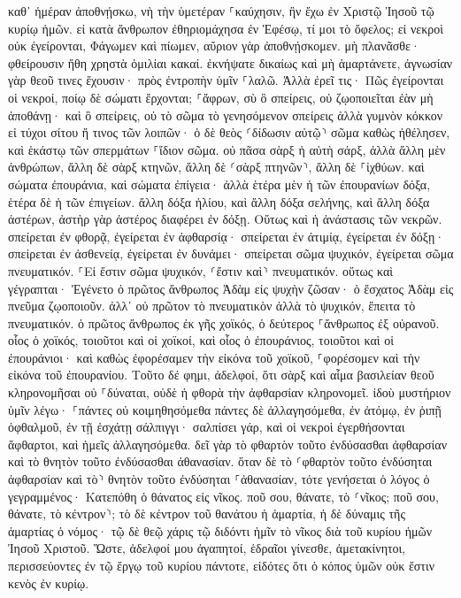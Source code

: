 \documentclass[twoside, 9pt]{extreport}
\begin{document}
καθ᾽ ἡμέραν ἀποθνῄσκω, νὴ τὴν ὑμετέραν ⸀καύχησιν, ἣν ἔχω ἐν Χριστῷ Ἰησοῦ τῷ κυρίῳ ἡμῶν. 
εἰ κατὰ ἄνθρωπον ἐθηριομάχησα ἐν Ἐφέσῳ, τί μοι τὸ ὄφελος; εἰ νεκροὶ οὐκ ἐγείρονται, Φάγωμεν καὶ πίωμεν, αὔριον γὰρ ἀποθνῄσκομεν. 
μὴ πλανᾶσθε· φθείρουσιν ἤθη χρηστὰ ὁμιλίαι κακαί. 
ἐκνήψατε δικαίως καὶ μὴ ἁμαρτάνετε, ἀγνωσίαν γὰρ θεοῦ τινες ἔχουσιν· πρὸς ἐντροπὴν ὑμῖν ⸀λαλῶ. 
Ἀλλὰ ἐρεῖ τις· Πῶς ἐγείρονται οἱ νεκροί, ποίῳ δὲ σώματι ἔρχονται; 
⸀ἄφρων, σὺ ὃ σπείρεις, οὐ ζῳοποιεῖται ἐὰν μὴ ἀποθάνῃ· 
καὶ ὃ σπείρεις, οὐ τὸ σῶμα τὸ γενησόμενον σπείρεις ἀλλὰ γυμνὸν κόκκον εἰ τύχοι σίτου ἤ τινος τῶν λοιπῶν· 
ὁ δὲ θεὸς ⸂δίδωσιν αὐτῷ⸃ σῶμα καθὼς ἠθέλησεν, καὶ ἑκάστῳ τῶν σπερμάτων ⸀ἴδιον σῶμα. 
οὐ πᾶσα σὰρξ ἡ αὐτὴ σάρξ, ἀλλὰ ἄλλη μὲν ἀνθρώπων, ἄλλη δὲ σὰρξ κτηνῶν, ἄλλη δὲ ⸂σὰρξ πτηνῶν⸃, ἄλλη δὲ ⸀ἰχθύων. 
καὶ σώματα ἐπουράνια, καὶ σώματα ἐπίγεια· ἀλλὰ ἑτέρα μὲν ἡ τῶν ἐπουρανίων δόξα, ἑτέρα δὲ ἡ τῶν ἐπιγείων. 
ἄλλη δόξα ἡλίου, καὶ ἄλλη δόξα σελήνης, καὶ ἄλλη δόξα ἀστέρων, ἀστὴρ γὰρ ἀστέρος διαφέρει ἐν δόξῃ. 
Οὕτως καὶ ἡ ἀνάστασις τῶν νεκρῶν. σπείρεται ἐν φθορᾷ, ἐγείρεται ἐν ἀφθαρσίᾳ· 
σπείρεται ἐν ἀτιμίᾳ, ἐγείρεται ἐν δόξῃ· σπείρεται ἐν ἀσθενείᾳ, ἐγείρεται ἐν δυνάμει· 
σπείρεται σῶμα ψυχικόν, ἐγείρεται σῶμα πνευματικόν. ⸀Εἰ ἔστιν σῶμα ψυχικόν, ⸂ἔστιν καὶ⸃ πνευματικόν. 
οὕτως καὶ γέγραπται· Ἐγένετο ὁ πρῶτος ἄνθρωπος Ἀδὰμ εἰς ψυχὴν ζῶσαν· ὁ ἔσχατος Ἀδὰμ εἰς πνεῦμα ζῳοποιοῦν. 
ἀλλ᾽ οὐ πρῶτον τὸ πνευματικὸν ἀλλὰ τὸ ψυχικόν, ἔπειτα τὸ πνευματικόν. 
ὁ πρῶτος ἄνθρωπος ἐκ γῆς χοϊκός, ὁ δεύτερος ⸀ἄνθρωπος ἐξ οὐρανοῦ. 
οἷος ὁ χοϊκός, τοιοῦτοι καὶ οἱ χοϊκοί, καὶ οἷος ὁ ἐπουράνιος, τοιοῦτοι καὶ οἱ ἐπουράνιοι· 
καὶ καθὼς ἐφορέσαμεν τὴν εἰκόνα τοῦ χοϊκοῦ, ⸀φορέσομεν καὶ τὴν εἰκόνα τοῦ ἐπουρανίου. 
Τοῦτο δέ φημι, ἀδελφοί, ὅτι σὰρξ καὶ αἷμα βασιλείαν θεοῦ κληρονομῆσαι οὐ ⸀δύναται, οὐδὲ ἡ φθορὰ τὴν ἀφθαρσίαν κληρονομεῖ. 
ἰδοὺ μυστήριον ὑμῖν λέγω· ⸀πάντες οὐ κοιμηθησόμεθα πάντες δὲ ἀλλαγησόμεθα, 
ἐν ἀτόμῳ, ἐν ῥιπῇ ὀφθαλμοῦ, ἐν τῇ ἐσχάτῃ σάλπιγγι· σαλπίσει γάρ, καὶ οἱ νεκροὶ ἐγερθήσονται ἄφθαρτοι, καὶ ἡμεῖς ἀλλαγησόμεθα. 
δεῖ γὰρ τὸ φθαρτὸν τοῦτο ἐνδύσασθαι ἀφθαρσίαν καὶ τὸ θνητὸν τοῦτο ἐνδύσασθαι ἀθανασίαν. 
ὅταν δὲ τὸ ⸂φθαρτὸν τοῦτο ἐνδύσηται ἀφθαρσίαν καὶ τὸ⸃ θνητὸν τοῦτο ἐνδύσηται ⸀ἀθανασίαν, τότε γενήσεται ὁ λόγος ὁ γεγραμμένος· Κατεπόθη ὁ θάνατος εἰς νῖκος. 
ποῦ σου, θάνατε, τὸ ⸂νῖκος; ποῦ σου, θάνατε, τὸ κέντρον⸃; 
τὸ δὲ κέντρον τοῦ θανάτου ἡ ἁμαρτία, ἡ δὲ δύναμις τῆς ἁμαρτίας ὁ νόμος· 
τῷ δὲ θεῷ χάρις τῷ διδόντι ἡμῖν τὸ νῖκος διὰ τοῦ κυρίου ἡμῶν Ἰησοῦ Χριστοῦ. 
Ὥστε, ἀδελφοί μου ἀγαπητοί, ἑδραῖοι γίνεσθε, ἀμετακίνητοι, περισσεύοντες ἐν τῷ ἔργῳ τοῦ κυρίου πάντοτε, εἰδότες ὅτι ὁ κόπος ὑμῶν οὐκ ἔστιν κενὸς ἐν κυρίῳ. 
\end{document}
